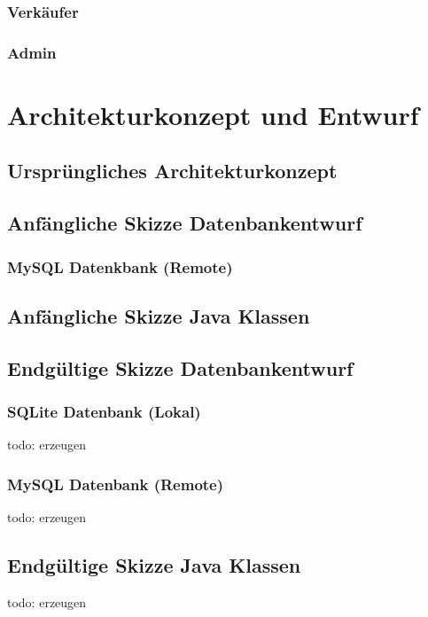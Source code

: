 \documentclass{scrartcl}
\begin{document}
\subsubsection{Verkäufer}

\subsubsection{Admin}


\newpage

\section{Architekturkonzept und Entwurf}

\subsection{Ursprüngliches Architekturkonzept}

\subsection{Anfängliche Skizze Datenbankentwurf}

\subsubsection{MySQL Datenkbank (Remote)}

\subsection{Anfängliche Skizze Java Klassen}

\subsection{Endgültige Skizze Datenbankentwurf}

\subsubsection{SQLite Datenbank (Lokal)}
todo: erzeugen

\subsubsection{MySQL Datenbank (Remote)}
todo: erzeugen

\subsection{Endgültige Skizze Java Klassen}
todo: erzeugen
\end{document}
